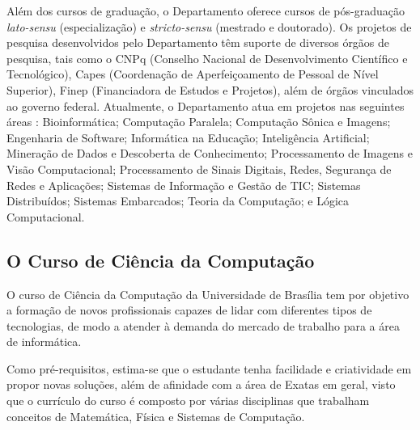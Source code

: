 Além dos cursos de graduação, o Departamento oferece cursos de pós-graduação \textit{lato-sensu} (especialização) e \textit{stricto-sensu} (mestrado e doutorado). Os projetos de pesquisa desenvolvidos pelo Departamento têm suporte de diversos órgãos de pesquisa, tais como o CNPq (Conselho Nacional de Desenvolvimento Científico e Tecnológico), Capes (Coordenação de Aperfeiçoamento de Pessoal de Nível Superior), Finep (Financiadora de Estudos e Projetos), além de órgãos vinculados ao governo federal. Atualmente, o Departamento atua em projetos nas seguintes áreas \citep{proposta_cic2007}: Bioinformática; Computação Paralela; Computação Sônica e Imagens; Engenharia de Software; Informática na Educação; Inteligência Artificial; Mineração de Dados e Descoberta de Conhecimento; Processamento de Imagens e Visão Computacional; Processamento de Sinais Digitais, Redes, Segurança de Redes e Aplicações; Sistemas de Informação e Gestão de TIC; Sistemas Distribuídos; Sistemas Embarcados; Teoria da Computação; e Lógica Computacional.

\subsection{O Curso de Ciência da Computação} \label{2title52}

O curso de Ciência da Computação da Universidade de Brasília \citep{unb_cic} tem por objetivo a formação de novos profissionais capazes de lidar com diferentes tipos de tecnologias, de modo a atender à demanda do mercado de trabalho para a área de informática.

Como pré-requisitos, estima-se que o estudante tenha facilidade e criatividade em propor novas soluções, além de afinidade com a área de Exatas em geral, visto que o currículo do curso é composto por várias disciplinas que trabalham conceitos de Matemática, Física e Sistemas de Computação.

